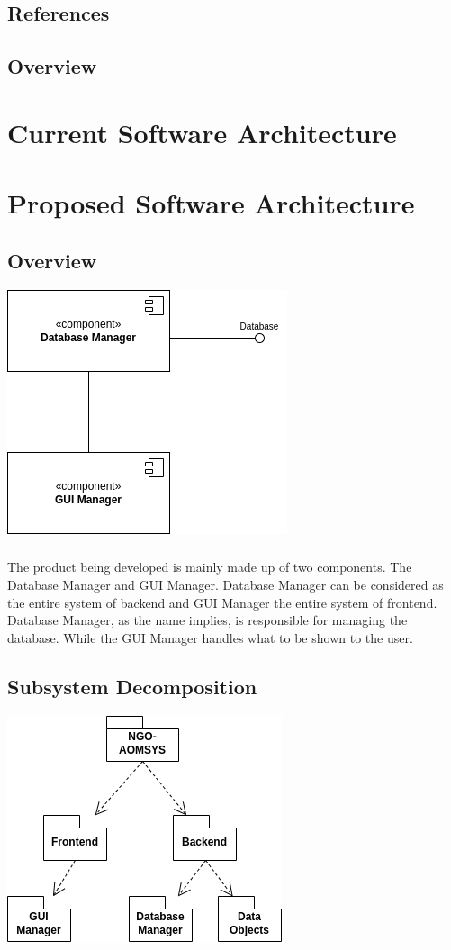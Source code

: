 \documentclass[a4paper,12pt]{report}
\begin{document}
		\section{References}
		\section{Overview}
	\chapter{Current Software Architecture}
	\chapter{Proposed Software Architecture}
		\section{Overview}
			\includegraphics{component_diagram.png}
			\paragraph{}The product being developed is mainly made up of two components. The Database Manager and GUI Manager. Database Manager can be considered as the entire system of backend and GUI Manager the entire system of frontend. Database Manager, as the name implies, is responsible for managing the database. While the GUI Manager handles what to be shown to the user. 
		\section{Subsystem Decomposition}
			\includegraphics{subsystem_decomposition_diagram.png}
\end{document}
